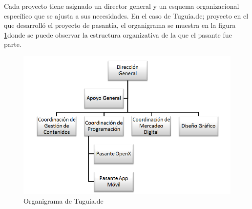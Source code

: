 Cada proyecto tiene asignado un director general y un esquema organizacional específico que se ajusta a sus necesidades. En el caso de Tuguia.de; proyecto en el que desarrolló el proyecto de pasantía, el organigrama se muestra en la figura \ref{fig:ogtgd}donde se puede observar la estructura organizativa de la que el pasante fue parte. 

\begin{figure}[h]
	\begin{center}
		\includegraphics[scale=0.4]{imagenes/OrganigramaTGD.png}
	\end{center}
	\caption{
		\label{fig:ogtgd}
		Organigrama de Tuguia.de
	}
\end{figure}
 